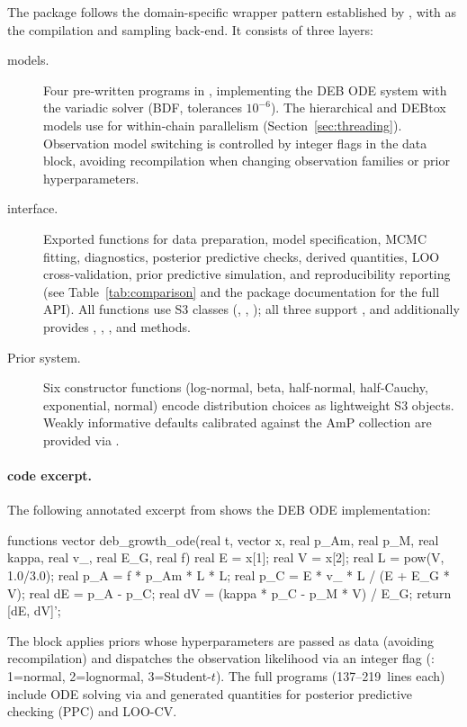 \documentclass[article,shortnames]{jss}
\begin{document}
The package follows the domain-specific  wrapper
pattern established by  \citep{Burknerbrms2017}, with
 \citep{Gabrycmdstanr2024} as the compilation and
sampling back-end.  It consists of three layers:
\begin{description}
  \item[ models.] Four pre-written  programs
    in , implementing the DEB ODE system with
    the variadic  solver (BDF, tolerances
    $10^{-6}$).  The hierarchical and DEBtox models use
     for within-chain parallelism
    (Section~\ref{sec:threading}).  Observation model
    switching is controlled by integer flags
    in the  data block, avoiding recompilation when
    changing observation families or prior hyperparameters.
  \item[ interface.] Exported functions for data
    preparation, model specification, MCMC fitting, diagnostics,
    posterior predictive checks, derived quantities,
    LOO cross-validation, prior predictive simulation,
    and reproducibility reporting (see Table~\ref{tab:comparison}
    and the package documentation for the full API).  All
    functions use S3 classes (,
    , ); all three support
    , and  additionally provides
    , , , and
     methods.
  \item[Prior system.] Six  constructor functions
    (log-normal, beta, half-normal, half-Cauchy, exponential,
    normal) encode distribution choices as lightweight S3 objects.
    Weakly informative defaults calibrated against the AmP
    collection \citep{MarquesAmP2018} are provided via
    .
\end{description}

\paragraph{ code excerpt.}
The following annotated excerpt from
 shows the DEB ODE
implementation:
\begin{CodeChunk}
\begin{CodeInput}
functions {
  vector deb_growth_ode(real t, vector x,
      real p_Am, real p_M, real kappa, real v_, real E_G, real f) {
    real E = x[1]; real V = x[2];
    real L = pow(V, 1.0/3.0);
    real p_A = f * p_Am * L * L;
    real p_C = E * v_ * L / (E + E_G * V);
    real dE = p_A - p_C;
    real dV = (kappa * p_C - p_M * V) / E_G;
    return [dE, dV]';
  }
}
\end{CodeInput}
\end{CodeChunk}
\noindent
The  block applies priors whose hyperparameters are
passed as  data (avoiding recompilation) and
dispatches the observation likelihood via an integer flag
(: 1=normal, 2=lognormal, 3=Student-$t$).  The
full programs (137--219~lines each) include ODE solving via
 and generated quantities for posterior
predictive checking (PPC) and LOO-CV.
\end{document}

